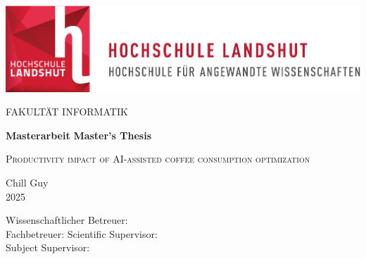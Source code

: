 \thispagestyle{empty}
\begin{titlepage}
	\vspace{3cm}

	\begin{center}
		\includegraphics[scale=0.8]{components/hl-logo.pdf}
	\end{center}

	\vspace{2.5cm}

	\begin{center}
		\Large FAKULTÄT INFORMATIK
	\end{center}

	\vspace{1cm}
	\begin{center}
		\Huge
		\ifgerman
			\textbf{Masterarbeit}
		\else
			\textbf{Master's Thesis}
		\fi\\
	\end{center}

	\vspace{1cm}

	\begin{center}
		\Large
		\textsc{Productivity impact of AI-assisted coffee consumption optimization}\\
	\end{center}

	\vspace{2.5cm}

	\begin{center}
		\Large
		Chill Guy\\
		2025
	\end{center}

	\vspace{2.5cm}
	\begin{center}
		\large
		\ifgerman
			Wissenschaftlicher Betreuer: \\
			Fachbetreuer:
		\else
			Scientific Supervisor: \\
			Subject Supervisor:
		\fi
	\end{center}

\end{titlepage}
